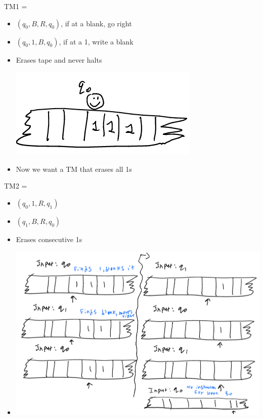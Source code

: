\documentclass[11pt]{article}
\begin{document}
TM1 = 
\begin{itemize}
\item \((q_0,B,R,q_0)\), if at a blank, go right
\item \((q_0,1,B,q_0)\), if at a 1, write a blank
\item Erases tape and never halts \begin{center}
\includegraphics[width=.9\linewidth]{./Images/i24.png}
\end{center}
\item Now we want a TM that erases all 1s
\end{itemize}
TM2 = 
\begin{itemize}
\item \((q_0,1,R,q_1)\)
\item \((q_1,B,R,q_0)\)
\item Erases consecutive 1s
\item \begin{center}
\includegraphics[width=.9\linewidth]{./Images/i25.png}
\end{center}
\end{itemize}
\end{document}
